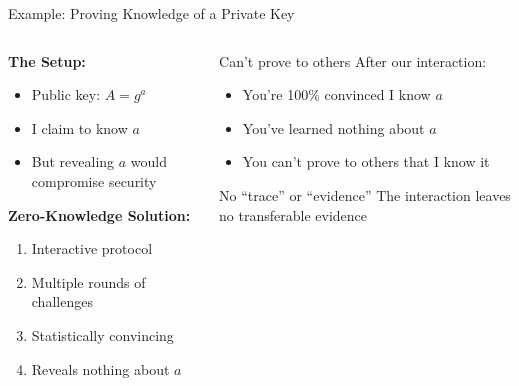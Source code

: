\documentclass[aspectratio=169, lualatex, handout]{beamer}
\begin{document}
\begin{frame}{Example: Proving Knowledge of a Private Key}
	\begin{columns}[c]
		\begin{column}{0.5\textwidth}
			\textbf{The Setup:}
			\begin{itemize}
				\item Public key: $A = g^{a}$
				\item I claim to know $a$
				\item But revealing $a$ would compromise security
			\end{itemize}
			\textbf{Zero-Knowledge Solution:}
			\begin{enumerate}
				\item Interactive protocol
				\item Multiple rounds of challenges
				\item Statistically convincing
				\item Reveals nothing about $a$
			\end{enumerate}
		\end{column}
		\begin{column}{0.5\textwidth}
			\begin{alertblock}{Can't prove to others}
				After our interaction:
				\begin{itemize}
					\item You're 100\% convinced I know $a$
					\item You've learned nothing about $a$
					\item You can't prove to others that I know it
				\end{itemize}
			\end{alertblock}
			\vspace{0.5em}
			\begin{exampleblock}{No ``trace'' or ``evidence''}
				The interaction leaves no transferable evidence
			\end{exampleblock}
		\end{column}
	\end{columns}
\end{frame}
\end{document}

